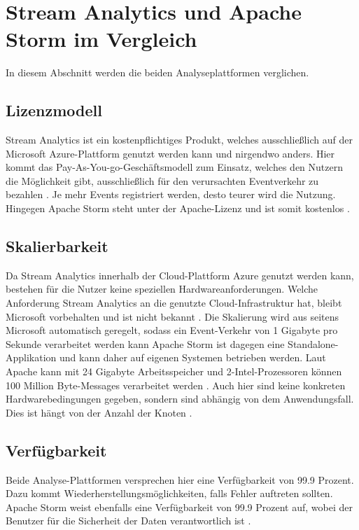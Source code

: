 \section{Stream Analytics und Apache Storm im Vergleich}
In diesem Abschnitt werden die beiden Analyseplattformen verglichen. 


\subsection{Lizenzmodell}
Stream Analytics ist ein kostenpflichtiges Produkt, welches ausschließlich auf der Microsoft Azure-Plattform genutzt werden kann und nirgendwo anders. Hier kommt das Pay-As-You-go-Geschäftsmodell zum Einsatz, welches den Nutzern die Möglichkeit gibt, ausschließlich für den verursachten Eventverkehr zu bezahlen \cite{Pricing.2017}. Je mehr Events registriert werden, desto teurer wird die Nutzung. Hingegen Apache Storm steht unter der Apache-Lizenz und ist somit kostenlos \cite{lizenz.2004}. 

\subsection{Skalierbarkeit}
Da Stream Analytics innerhalb der Cloud-Plattform Azure genutzt werden kann, bestehen für die Nutzer keine speziellen Hardwareanforderungen. Welche Anforderung Stream Analytics an die genutzte Cloud-Infrastruktur hat, bleibt Microsoft vorbehalten und ist nicht bekannt \cite{samacha.2017}. Die Skalierung wird aus seitens Microsoft automatisch geregelt, sodass ein Event-Verkehr von 1 Gigabyte pro Sekunde verarbeitet werden kann \cite{samacha.19.12.2017b} Apache Storm ist dagegen eine Standalone-Applikation und kann daher auf eigenen Systemen betrieben werden. Laut Apache kann mit 24 Gigabyte Arbeitsspeicher und 2-Intel-Prozessoren können 100 Million Byte-Messages verarbeitet werden \cite{apachescale.2017}. Auch hier sind keine konkreten Hardwarebedingungen gegeben, sondern sind abhängig von dem Anwendungsfall. Dies ist hängt von der Anzahl der Knoten \cite{samacha.2017}.


\subsection{Verfügbarkeit}
Beide Analyse-Plattformen versprechen hier eine Verfügbarkeit von 99.9 Prozent. Dazu kommt Wiederherstellungsmöglichkeiten, falls Fehler auftreten sollten. Apache Storm weist ebenfalls eine Verfügbarkeit von 99.9 Prozent auf, wobei der Benutzer für die Sicherheit der Daten verantwortlich ist \cite{samacha.2017}. 

